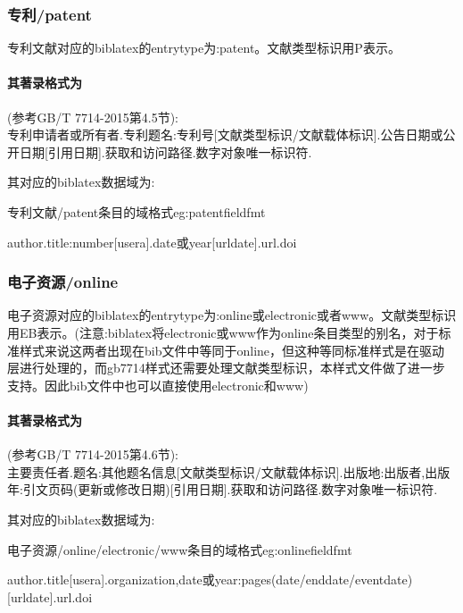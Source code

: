 \subsubsection{专利/patent}
\begin{refentry}{}{}%
专利文献对应的biblatex的entrytype为:patent。文献类型标识用P表示。

\paragraph{其著录格式为}(参考GB/T 7714-2015第4.5节):\\
专利申请者或所有者.专利题名:专利号[文献类型标识/文献载体标识].公告日期或公开日期[引用日期].获取和访问路径.数字对象唯一标识符.
\end{refentry}

其对应的biblatex数据域为:
\begin{example}{专利文献/patent条目的域格式}{eg:patentfieldfmt}
\begin{texlist}
author.title:number[usera].date或year[urldate].url.doi
\end{texlist}
\end{example}

\subsubsection{电子资源/online}
\begin{refentry}{}{}%
电子资源对应的biblatex的entrytype为:online或electronic或者www。文献类型标识用EB表示。(注意:biblatex将electronic或www作为online条目类型的别名，对于标准样式来说这两者出现在bib文件中等同于online，但这种等同标准样式是在驱动层进行处理的，而gb7714样式还需要处理文献类型标识，本样式文件做了进一步支持。因此bib文件中也可以直接使用electronic和www)

\paragraph{其著录格式为}(参考GB/T 7714-2015第4.6节):\\
主要责任者.题名:其他题名信息[文献类型标识/文献载体标识].出版地:出版者,出版年:引文页码(更新或修改日期)[引用日期].获取和访问路径.数字对象唯一标识符.
\end{refentry}

其对应的biblatex数据域为:
\begin{example}{电子资源/online/electronic/www条目的域格式}{eg:onlinefieldfmt}
\begin{texlist}
author.title[usera].organization,date或year:pages(date/enddate/eventdate)[urldate].url.doi
\end{texlist}
\end{example}

